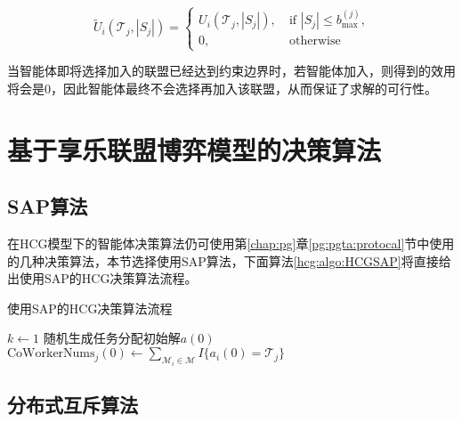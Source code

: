 \begin{equation}
\label{hcg:eq:modifiedAgentU}
	\widetilde U_i(\mathcal{T}_j,|S_j|) = 
	\begin{cases}
		U_i(\mathcal{T}_j,|S_j|),\ & \text{if $|S_j|\leq b_{\text{max}}^{(j)}$,}\\
		0,\ & \text{otherwise}
	\end{cases}
\end{equation}

当智能体即将选择加入的联盟已经达到约束边界时，若智能体加入，则得到的效用将会是0，因此智能体最终不会选择再加入该联盟，从而保证了求解的可行性。

\section{基于享乐联盟博弈模型的决策算法}
\label{hcg:decision}

\subsection{SAP算法}
在HCG模型下的智能体决策算法仍可使用第\ref{chap:pg}章\ref{pg:pgta:protocal}节中使用的几种决策算法，本节选择使用SAP算法，下面算法\ref{hcg:algo:HCGSAP}将直接给出使用SAP的HCG决策算法流程。

\begin{algorithm}[htb]
	\caption{使用SAP的HCG决策算法流程}
	\label{hcg:algo:HCGSAP}
	\small
	\SetAlgoLined
	$k \gets 1$\;
	随机生成任务分配初始解$a(0)$\;
	$\text{CoWorkerNums}_j(0) \gets \sum_{\mathcal{M}_i \in \mathcal{M}} I\{a_i(0)=\mathcal{T}_j\}$\;
\end{algorithm}

\subsection{分布式互斥算法}

